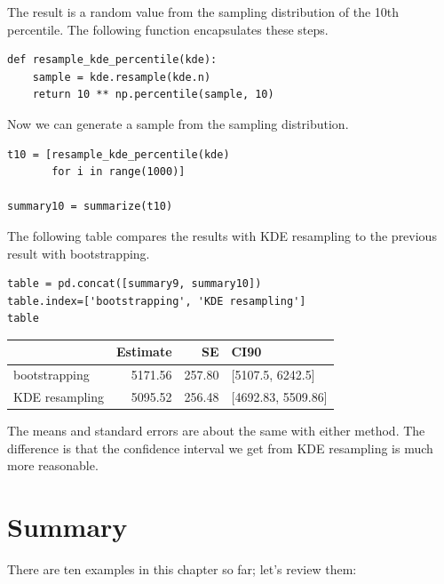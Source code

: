 The result is a random value from the sampling distribution of the 10th
percentile. The following function encapsulates these steps.

\begin{lstlisting}[]
def resample_kde_percentile(kde):
    sample = kde.resample(kde.n)
    return 10 ** np.percentile(sample, 10)
\end{lstlisting}

Now we can generate a sample from the sampling distribution.

\begin{lstlisting}[]
t10 = [resample_kde_percentile(kde)
       for i in range(1000)]

summary10 = summarize(t10)
\end{lstlisting}

The following table compares the results with KDE resampling to the
previous result with bootstrapping.

\begin{lstlisting}[]
table = pd.concat([summary9, summary10])
table.index=['bootstrapping', 'KDE resampling']
table
\end{lstlisting}

\begin{tabular}{lrrl}
\midrule
{} &  Estimate &      SE &                CI90 \\
\midrule
bootstrapping  &   5171.56 &  257.80 &    [5107.5, 6242.5] \\
KDE resampling &   5095.52 &  256.48 &  [4692.83, 5509.86] \\
\midrule
\end{tabular}

The means and standard errors are about the same with either method. The
difference is that the confidence interval we get from KDE resampling is
much more reasonable.

\hypertarget{summary}{%
\section{Summary}\label{summary}}

There are ten examples in this chapter so far; let's review them:


